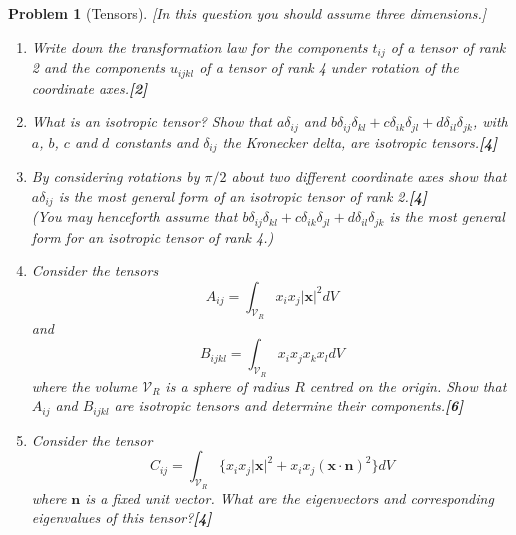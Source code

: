 \documentclass[a4paper]{article}
\theoremstyle{new}
\newtheorem{qns}{Problem}[section]
\begin{document}
\begin{qns}[Tensors]
[In this question you should assume three dimensions.]
\begin{enumerate}[label=(\roman*)]
\item Write down the transformation law for the components $t_{ij}$ of a tensor of rank 2 and the components $u_{ijkl}$ of a tensor of rank 4 under rotation of the coordinate axes.\hfill\textbf{[2]}
\item What is an isotropic tensor? Show that $a\delta_{ij}$ and $b\delta_{ij}\delta_{kl}+c\delta_{ik}\delta_{jl}+d\delta_{il}\delta_{jk}$, with $a$, $b$, $c$ and $d$ constants and $\delta_{ij}$ the Kronecker delta, are isotropic tensors.\hfill\textbf{[4]}
\item By considering rotations by $\pi/2$ about two different coordinate axes show that $a\delta_{ij}$ is the most general form of an isotropic tensor of rank 2.\hfill\textbf{[4]}\\[5pt]
(You may henceforth assume that $b\delta_{ij}\delta_{kl}+c\delta_{ik}\delta_{jl}+d\delta_{il}\delta_{jk}$ is the most general form for an isotropic tensor of rank 4.)
\item Consider the tensors
$$A_{ij}=\int_{\mathcal{V}_R}x_ix_j|\mathbf{x}|^2dV$$
and
$$B_{ijkl}=\int_{\mathcal{V}_R}x_ix_jx_kx_ldV$$
where the volume $\mathcal{V}_R$ is a sphere of radius $R$ centred on the origin. Show that $A_{ij}$ and $B_{ijkl}$ are isotropic tensors and determine their components.\hfill\textbf{[6]}
\item Consider the tensor
$$C_{ij}=\int_{\mathcal{V}_R}\{x_ix_j|\mathbf{x}|^2+x_ix_j(\mathbf{x}\cdot\mathbf{n})^2\}dV$$
where $\mathbf{n}$ is a fixed unit vector. What are the eigenvectors and corresponding eigenvalues of this tensor?\hfill\textbf{[4]}
\end{enumerate}
\end{qns}
\newpage
\end{document}

